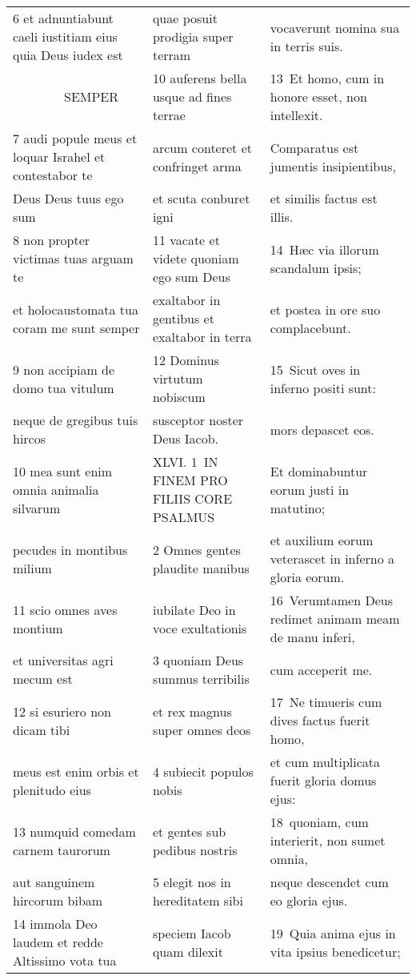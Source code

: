 \documentclass{article}
\begin{document}
\begin{longtable}{@{}p{}p{}p{}@{}}
6 et adnuntiabunt caeli iustitiam eius quia Deus iudex est	&	quae posuit prodigia super terram	&	vocaverunt nomina sua in terris suis.	\\
    SEMPER	&	10 auferens bella usque ad fines terrae	&	13 Et homo, cum in honore esset, non intellexit.	\\
7 audi popule meus et loquar Israhel et contestabor te	&	arcum conteret et confringet arma	&	Comparatus est jumentis insipientibus,	\\
Deus Deus tuus ego sum	&	et scuta conburet igni	&	et similis factus est illis.	\\
8 non propter victimas tuas arguam te	&	11 vacate et videte quoniam ego sum Deus	&	14 Hæc via illorum scandalum ipsis;	\\
et holocaustomata tua coram me sunt semper	&	exaltabor in gentibus et exaltabor in terra	&	et postea in ore suo complacebunt.	\\
9 non accipiam de domo tua vitulum	&	12 Dominus virtutum nobiscum	&	15 Sicut oves in inferno positi sunt:	\\
neque de gregibus tuis hircos	&	susceptor noster Deus Iacob.	&	mors depascet eos.	\\
10 mea sunt enim omnia animalia silvarum	&	XLVI. 1 IN FINEM PRO FILIIS CORE PSALMUS	&	Et dominabuntur eorum justi in matutino;	\\
pecudes in montibus milium	&	2 Omnes gentes plaudite manibus	&	et auxilium eorum veterascet in inferno a gloria eorum.	\\
11 scio omnes aves montium	&	iubilate Deo in voce exultationis	&	16 Verumtamen Deus redimet animam meam de manu inferi,	\\
et universitas agri mecum est	&	3 quoniam Deus summus terribilis	&	cum acceperit me.	\\
12 si esuriero non dicam tibi	&	et rex magnus super omnes deos	&	17 Ne timueris cum dives factus fuerit homo,	\\
meus est enim orbis et plenitudo eius	&	4 subiecit populos nobis	&	et cum multiplicata fuerit gloria domus ejus:	\\
13 numquid comedam carnem taurorum	&	et gentes sub pedibus nostris	&	18 quoniam, cum interierit, non sumet omnia,	\\
aut sanguinem hircorum bibam	&	5 elegit nos in hereditatem sibi	&	neque descendet cum eo gloria ejus.	\\
14 immola Deo laudem et redde Altissimo vota tua	&	speciem Iacob quam dilexit	&	19 Quia anima ejus in vita ipsius benedicetur;	\\

\end{longtable}
\end{document}
